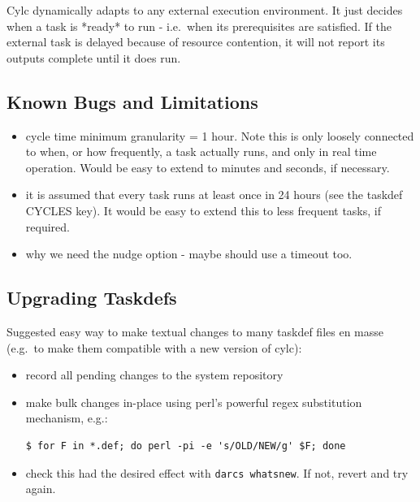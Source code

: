 \documentclass[11pt,a4paper]{article}
\begin{document}
Cylc dynamically adapts to any external execution environment. It just
decides when a task is *ready* to run - i.e.\ when its prerequisites 
are satisfied.  If the external task is delayed because of resource
contention, it will not report its outputs complete until it does run.

\subsection{Known Bugs and Limitations}

\begin{itemize}
    \item cycle time minimum granularity = 1 hour. Note this is
        only loosely connected to when, or how frequently, a task
        actually runs, and only in real time operation. Would be easy to
        extend to minutes and seconds, if necessary.

    \item it is assumed that every task runs at least once in 24 hours
        (see the taskdef CYCLES key). It would be easy to extend this to
        less frequent tasks, if required.

    \item why we need the nudge option - maybe should use a timeout too.

\end{itemize}

\subsection{Upgrading Taskdefs}

Suggested easy way to make textual changes to many taskdef files en
masse (e.g.\ to make them compatible with a new version of cylc):

\begin{itemize}
    \item record all pending changes to the system repository
    \item make bulk changes in-place using perl's powerful regex 
       substitution mechanism, e.g.:
       \begin{lstlisting}
$ for F in *.def; do perl -pi -e 's/OLD/NEW/g' $F; done
       \end{lstlisting}
   \item check this had the desired effect with 
       \lstinline=darcs whatsnew=. If not, revert and try again.
\end{itemize}
\end{document}
